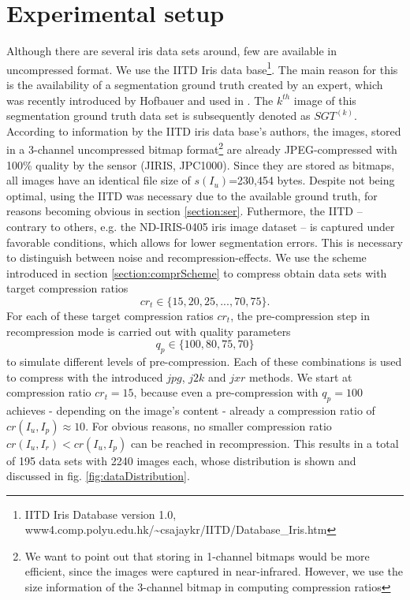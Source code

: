\documentclass[10pt,twocolumn,letterpaper]{article}
\begin{document}
\section{Experimental setup}
\label{section:exSetup}
Although there are several iris data sets around, few are available in uncompressed format. We use the IITD Iris data base\footnote{IITD Iris Database version 1.0, www4.comp.polyu.edu.hk/\textasciitilde csajaykr/IITD/Database\_Iris.htm}. The main reason for this is the availability of a segmentation ground truth created by an expert, which was recently introduced by Hofbauer \etal \cite{Hofbauer14b} and used in \cite{severeCompression}. The $k^{th}$ image of this segmentation ground truth data set is subsequently denoted as $SGT^{(k)}$. 
According to information by the IITD iris data base's authors, the images, stored in a 3-channel uncompressed bitmap format\footnote{We want to point out that storing in 1-channel bitmaps would be more efficient, since the images were captured in near-infrared. However, we use the size information of the 3-channel bitmap in computing compression ratios} are already JPEG-compressed with 100\% quality by the sensor (JIRIS, JPC1000). Since they are stored as bitmaps, all images have an identical file size of $s(I_u)$=230,454 bytes. Despite not being optimal, using the IITD was necessary due to the available ground truth, for reasons becoming obvious in section \ref{section:ser}. Futhermore, the IITD -- contrary to others, e.g. the ND-IRIS-0405 iris image dataset \cite{Bowyer_thend-iris-0405} -- is captured under favorable conditions, which allows for lower segmentation errors. This is necessary to distinguish between noise and recompression-effects. We use the scheme introduced in section \ref{section:comprScheme} to compress obtain data sets with target compression ratios
\begin{equation}
	cr_t \in \{15, 20, 25, ..., 70, 75\}.
\end{equation}
For each of these target compression ratios $cr_t$, the pre-compression step in recompression mode is carried out with quality parameters
\begin{equation}
	q_p \in \{100, 80, 75, 70\}
\end{equation} 
to simulate different levels of pre-compression. Each of these combinations is used to compress with the introduced $jpg$, $j2k$ and $jxr$ methods. We start at compression ratio $cr_t=15$, because even a pre-compression with $q_p=100$ achieves - depending on the image's content - already a compression ratio of $cr(I_u, I_p) \approx 10$. For obvious reasons, no smaller compression ratio $cr(I_u, I_r) < cr(I_u, I_p)$ can be reached in recompression. This results in a total of 195 data sets with 2240 images each, whose distribution is shown and discussed in fig. \ref{fig:dataDistribution}.
\end{document}
